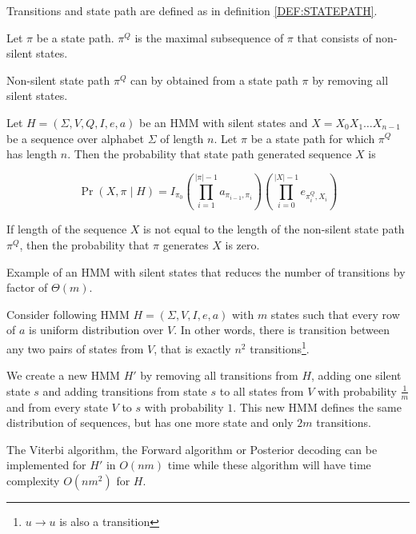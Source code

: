 \begin{definition}
Transitions and state path are defined as in definition \ref{DEF:STATEPATH}. 

Let $\pi$ be a state path.  $\pi^Q$ is
the maximal subsequence of $\pi$ that consists of non-silent states.
\end{definition}

\begin{note}
Non-silent state path $\pi^Q$ can by obtained from a state path $\pi$ by removing all silent
states.
\end{note}

\begin{definition}
Let $H=(\Sigma,V,Q,I,e,a)$ be an HMM with silent states and $X=X_0X_1\dots
X_{n-1}$ be a sequence over
alphabet $\Sigma$ of length $n$. Let $\pi$ be a state path for which $\pi^Q$ has
length $n$. Then the probability that state path generated sequence $X$ is 

\[\Pr\left(X,\pi\mid H\right) =
I_{\pi_0}\left(\prod_{i=1}^{|\pi|-1}a_{\pi_{i-1},\pi_i}\right)\left(\prod_{i=0}^{|X|-1}e_{\pi^Q_i,X_i}\right)\]

If length of the sequence $X$ is not equal to the length of the non-silent state
path $\pi^Q$, then the
probability that $\pi$ generates $X$ is zero.
\end{definition}

\begin{example}
Example of an HMM with silent states that reduces the number of transitions by factor
of $\Theta(m)$.

Consider following HMM $H=(\Sigma,V,I,e,a)$ with $m$ states such that every row
of $a$ is uniform distribution over $V$. In other words, there is transition
between any two pairs of states from $V$, that is exactly $n^2$
transitions\footnote{$u\to u$ is also a transition}.

We create a new HMM $H'$ by removing all transitions from $H$, adding one silent
state $s$ and adding transitions
from state $s$ to all states from $V$ with probability $\frac1m$  and from every
state $V$ to $s$ with probability $1$. This new HMM
defines the same distribution of sequences, but has one more state and only $2m$
transitions. 

The Viterbi algorithm, the Forward algorithm or Posterior decoding can be
implemented for $H'$ in $O(nm)$ time while these algorithm will have time
complexity $O(nm^2)$ for $H$.
\end{example}

